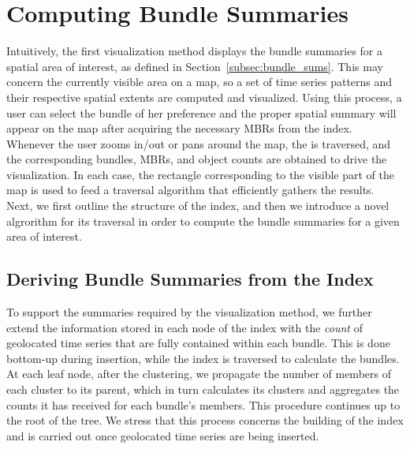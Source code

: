 
\section{Computing Bundle Summaries}
\label{sec:bundles_summary}

\graphicspath{{Papers/ElsevierBigDataResearch/}}

Intuitively, the first visualization method displays the bundle summaries for a spatial area of interest, as defined in Section~\ref{subsec:bundle_sums}. This may concern the currently visible area on a map, so a set of time series patterns and their respective spatial extents are computed and visualized. Using this process, a user can select the bundle of her preference and the proper spatial summary will appear on the map after acquiring the necessary MBRs from the \btsr index. Whenever the user zooms in/out or pans around the map, the \btsr is traversed, and the corresponding bundles, MBRs, and object counts are obtained to drive the visualization. In each case, the rectangle corresponding to the visible part of the map is used to feed a traversal algorithm that efficiently gathers the results. Next, we first outline the structure of the \btsr index, and then we introduce a novel algrorithm for its traversal in order to compute the bundle summaries for a given area of interest.

\subsection{Deriving Bundle Summaries from the \btsr Index}
\label{subsec:visualization}

To support the summaries required by the visualization method, we further extend the information stored in each node of the \btsr index with the {\em count} of geolocated time series that are fully contained within each bundle. This is done bottom-up during insertion, while the index is traversed to calculate the bundles. At each leaf node, after the clustering, we propagate the number of members of each cluster to its parent, which in turn calculates its clusters and aggregates the counts it has received for each bundle's members. This procedure continues up to the root of the tree. We stress that this process concerns the building of the index and is carried out once geolocated time series are being inserted.

